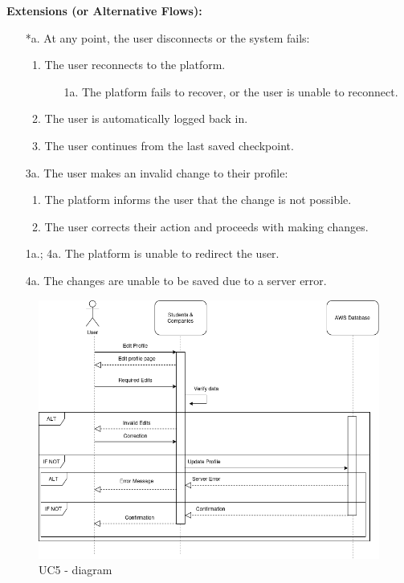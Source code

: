 \begin{itemize}[label={[\textbf{UC}]}, align=left, leftmargin=*]
    \textbf{Extensions (or Alternative Flows):} 
    \begin{enumerate}[label=\arabic*.]
        \item[*a.] At any point, the user disconnects or the system fails:
            \begin{enumerate}[label=\arabic*.]
                \item The user reconnects to the platform.
                    \begin{enumerate}[label=\alph*.]
                        \item[1a.] The platform fails to recover, or the user is unable to reconnect.
                    \end{enumerate}
                 \item The user is automatically logged back in.
                 \item The user continues from the last saved checkpoint.
            \end{enumerate}
        \item[3a.] The user makes an invalid change to their profile:
            \begin{enumerate}[label=\arabic*.]
                \item The platform informs the user that the change is not possible.
                \item The user corrects their action and proceeds with making changes.
            \end{enumerate}
        \item[1a.; 4a.] The platform is unable to redirect the user.
        \item[4a.] The changes are unable to be saved due to a server error.
        \end{enumerate}
\end{itemize}

     \begin{figure}[H]
    	\includegraphics[width=\textwidth,height=\textheight,keepaspectratio]{RASD-Latex/assets/Use Case Diagrams/UC5.png}
    	\caption{UC5 - diagram}
    	\label{fig:DataRequest}
    \end{figure}

